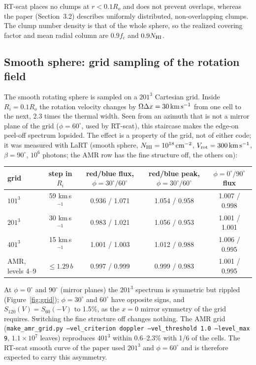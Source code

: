 \documentclass[english,a4paper]{my_memo}
\begin{document}
RT-scat places no clumps at $r<0.1R_o$ and does not prevent overlaps, whereas the paper
(Section~3.2) describes uniformly distributed, non-overlapping clumps.  The clump number
density is that of the whole sphere, so the realized covering factor and mean radial
column are $0.9f_c$ and $0.9N_{\rm HI}$.

\subsection{Smooth sphere: grid sampling of the rotation field}

The smooth rotating sphere is sampled on a $201^3$ Cartesian grid.  Inside $R_i=0.1R_o$
the rotation velocity changes by $\Omega\Delta x=30\,{\rm km\,s^{-1}}$ from one cell to the
next, 2.3 times the thermal width.  Seen from an azimuth that is not a mirror plane of the
grid ($\phi=60^\circ$, used by RT-scat), this staircase makes the edge-on peel-off spectrum
lopsided.  The effect is a property of the grid, not of either code; it was measured with
LaRT (smooth sphere, $N_{\rm HI}=10^{18}\,{\rm cm^{-2}}$, $V_{\rm rot}=300\,{\rm km\,s^{-1}}$,
$\beta=90^\circ$, $10^6$ photons; the AMR row has the fine structure off, the others on):

\begin{center}
\begin{tabular}{lcccc}
\toprule
grid & step in $R_i$ & red/blue flux, $\phi=30^\circ/60^\circ$ & red/blue peak, $\phi=30^\circ/60^\circ$ & $\phi=0^\circ/90^\circ$ flux \\
\midrule
$101^3$ & 59 km\,s$^{-1}$ & 0.936 / 1.071 & 1.054 / 0.958 & 1.007 / 0.998 \\
$201^3$ & 30 km\,s$^{-1}$ & 0.983 / 1.021 & 1.056 / 0.953 & 1.001 / 1.001 \\
$401^3$ & 15 km\,s$^{-1}$ & 1.001 / 1.003 & 1.012 / 0.988 & 1.006 / 0.995 \\
AMR, levels 4--9 & $\le 1.29\,b$ & 0.997 / 0.999 & 0.999 / 0.983 & 1.001 / 0.995 \\
\bottomrule
\end{tabular}
\end{center}

At $\phi=0^\circ$ and $90^\circ$ (mirror planes) the $201^3$ spectrum is symmetric but
rippled (Figure~\ref{fig:grid}); $\phi=30^\circ$ and $60^\circ$ have opposite signs, and
$S_{120}(V)=S_{60}(-V)$ to 1.5\%, as the $x=0$ mirror symmetry of the grid requires.
Switching the fine structure off changes nothing.  The AMR grid
(\texttt{make\_amr\_grid.py --vel\_criterion doppler --vel\_threshold 1.0 --level\_max 9},
$1.1\times10^7$ leaves) reproduces $401^3$ within 0.6--2.3\% with 1/6 of the cells.
The RT-scat smooth curve of the paper used $201^3$ and $\phi=60^\circ$ and is therefore
expected to carry this asymmetry.
\end{document}
